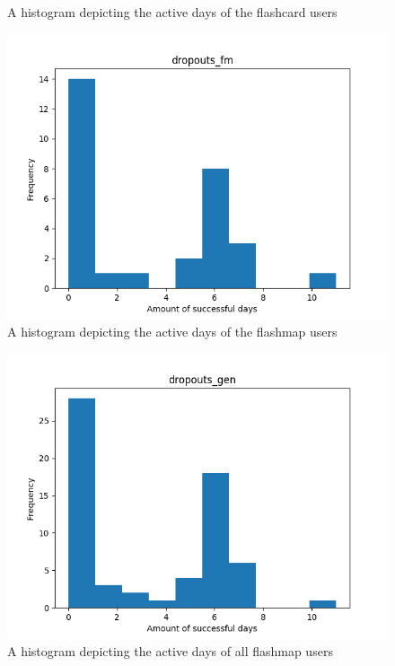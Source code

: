 \begin{figure}
    \caption{A histogram depicting the active days of the flashcard users}
    \label{fig:dropouts_fc}
\end{figure}
\begin{figure}
    \includegraphics{img/dropouts_fm.png}
    \caption{A histogram depicting the active days of the flashmap users}
    \label{fig:dropouts_fm}
\end{figure}
\begin{figure}
    \includegraphics{img/dropouts_gen.png}
    \caption{A histogram depicting the active days of all flashmap users}
    \label{fig:dropouts_gen}
\end{figure}
